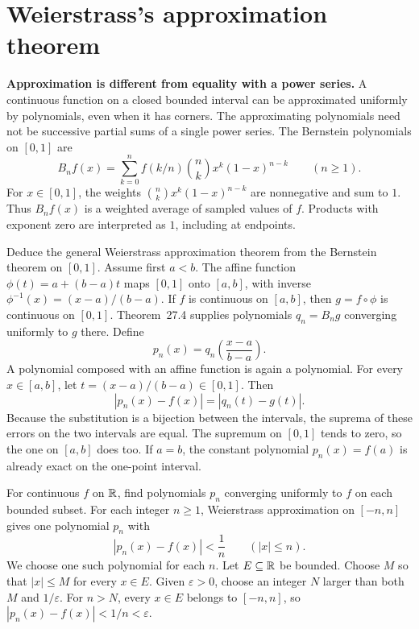 \section{Weierstrass's approximation theorem}
\label{sec:weierstrass-new}
\textbf{Approximation is different from equality with a power series.}
A continuous function on a closed bounded interval can be approximated uniformly
by polynomials, even when it has corners. The approximating polynomials need
not be successive partial sums of a single power series.
The Bernstein polynomials on $[0,1]$ are
\[
 B_nf(x)=\sum_{k=0}^n f(k/n)\binom nk x^k(1-x)^{n-k}\qquad(n\ge1).
\]
For $x\in[0,1]$, the weights $\binom nk x^k(1-x)^{n-k}$ are nonnegative
and sum to $1$. Thus $B_nf(x)$ is a weighted average of sampled values of $f$.
Products with exponent zero are interpreted as $1$, including at endpoints.

\goal Deduce the general Weierstrass approximation theorem from the
Bernstein theorem on $[0,1]$.
Assume first $a<b$. The affine function $\phi(t)=a+(b-a)t$ maps $[0,1]$
onto $[a,b]$, with inverse $\phi^{-1}(x)=(x-a)/(b-a)$.
If $f$ is continuous on $[a,b]$, then $g=f\circ\phi$ is continuous on $[0,1]$.
Theorem~27.4 supplies polynomials $q_n=B_ng$ converging uniformly to $g$ there.
Define
\[
 p_n(x)=q_n\left(\frac{x-a}{b-a}\right).
\]
A polynomial composed with an affine function is again a polynomial.
For every $x\in[a,b]$, let $t=(x-a)/(b-a)\in[0,1]$. Then
\[
 |p_n(x)-f(x)|=|q_n(t)-g(t)|.
\]
Because the substitution is a bijection between the intervals, the suprema
of these errors on the two intervals are equal. The supremum on $[0,1]$
tends to zero, so the one on $[a,b]$ does too.
If $a=b$, the constant polynomial $p_n(x)=f(a)$ is already exact on the
one-point interval.

\goal For continuous $f$ on $\mathbb{R}$, find polynomials $p_n$ converging uniformly
to $f$ on each bounded subset.
For each integer $n\ge1$, Weierstrass approximation on $[-n,n]$ gives
one polynomial $p_n$ with
\[
 |p_n(x)-f(x)|<\frac1n\qquad(|x|\le n).
\]
We choose one such polynomial for each $n$.
Let $E\subseteq\mathbb{R}$ be bounded. Choose $M$ so that $|x|\le M$ for every
$x\in E$. Given $\varepsilon>0$, choose an integer $N$ larger than both
$M$ and $1/\varepsilon$. For $n>N$, every $x\in E$ belongs to $[-n,n]$,
so $|p_n(x)-f(x)|<1/n<\varepsilon$.

